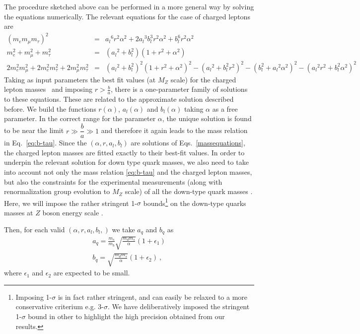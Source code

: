 \documentclass[english,10pt,aps,prd,a4paper,preprintnumbers,floatfix,nofootinbib,showpacs,superscriptaddress]{revtex4-1}
\begin{document}
  The procedure sketched above can be performed in a more general way
  by solving the equations numerically. The relevant equations for the
  case of charged leptons are
\begin{eqnarray} \label{massequations}
(m_e m_\mu m_\tau)^2 & = & {a_l}^6r^2 \alpha^2 + 2 {a_l}^3 b_l^3 r^2 \alpha^2+b_l^6 r^2 \alpha^2 
  \nonumber \\ 
m_e^2 + m_\mu^2 + m_\tau^2 & = & ({a_l}^2 + b_l^2)(1+r^2+\alpha^2)  \nonumber \\
 2m_e^2m_\mu^2 + 2m_e^2 m_\tau^2 + 2m_\mu^2 m_\tau^2  & = &
({a_l}^2 + b_l^2)^2(1+r^2+\alpha^2)^2  -({a_l}^2 +b_l^2r^2)^2  - (b_l^2+{a_l}^2 \alpha^2)^2
 - ({a_l}^2 r^2+ b_l^2 \alpha^2)^2 
\end{eqnarray}
Taking as input parameters the best fit values (at $M_Z$ scale) for
the charged lepton masses~\cite{Xing:2011aa} and imposing
$r > \frac{b}{a}$, there is a one-parameter family of solutions to
these equations.  These are related to the approximate solution
described before.
%
  We build the functions $r(\alpha)$, $a_l(\alpha)$ and $b_l(\alpha)$
  taking $\alpha$ as a free parameter.  
%
  In the correct range for the parameter $\alpha$, the unique solution
  is found to be near the limit $r \gg \dfrac{b}{a} \gg 1$ and
  therefore it again leads to the mass relation in
  Eq.~\ref{eq:b-tau}. Since the $(\alpha, r, a_l, b_l)$ are solutions
  of Eqs.~\ref{massequations}, the charged lepton masses are fitted
  exactly to their best-fit values.
%
  In order to underpin the relevant solution for down type quark
  masses, we also need to take into account not only the mass relation
  \ref{eq:b-tau} and the charged lepton masses, but also the
  constraints for the experimental measurements (along with
  renormalization group evolution to $M_Z$ scale) of all the down-type
  quark masses \cite{Xing:2011aa}. Here, we will impose the rather
  stringent 1-$\sigma$ bounds\footnote{Imposing 1-$\sigma$ is in
    fact rather stringent, and can easily be relaxed to a more
    conservative criterium e.g. 3-$\sigma$. We have deliberatively
    imposed the stringent 1-$\sigma$ bound in other to highlight the
    high precision obtained from our results. } on the down-type
quarks masses at $Z$ boson energy scale \cite{Xing:2011aa}.
    
Then, for each valid $( \alpha, r, a_l, b_l,)$ we take $a_q$ and $b_q$ as 
   \begin{eqnarray}
   a_q = \frac{m_s}{m_b} \sqrt{\frac{m_d m_s}{\alpha}} (1+\epsilon_1) \\
   b_q = \sqrt{\frac{m_d m_s}{\alpha}}(1+\epsilon_2)~,
  \end{eqnarray}
  where $\epsilon_1$ and $\epsilon_2$ are expected to be small.
  
\end{document}

